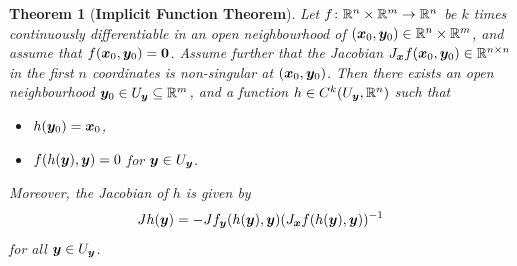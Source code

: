 \documentclass[11pt,a4paper]{memoir}
\newtheorem*{theorem*}{Theorem}
\begin{document}
\begin{theorem*}[\textbf{Implicit Function Theorem}]
Let $f\colon \mathbb{R}^n\times \mathbb{R}^m\to \mathbb{R}^n$ be $k$ times continuously differentiable in an open neighbourhood of $(\bm{x}_0,\bm{y}_0)\in \mathbb{R}^{n}\times \mathbb{R}^m$, and assume that $f(\bm{x}_0,\bm{y}_0) = \bm{0}$. Assume further 
that the Jacobian $J_{\bm{x}}f(\bm{x}_0,\bm{y}_0)\in \mathbb{R}^{n\times n}$ in the first $n$ coordinates is {\em non-singular} at $(\bm{x}_0,\bm{y}_0)$. Then there exists an open neighbourhood $\bm{y}_0\in U_{\bm{y}}\subseteq \mathbb{R}^m$, and a function $h\in C^k(U_{\bm{y}},\mathbb{R}^n)$ such that 
\begin{itemize}
 \item $h(\bm{y}_0) = \bm{x}_0$,
\item $f(h(\bm{y}),\bm{y})=0$ for $\bm{y}\in U_{\bm{y}}$.
\end{itemize}
Moreover, the Jacobian of $h$ is given by
\begin{equation*}
 Jh(\bm{y}) = -Jf_{\bm{y}}(h(\bm{y}),\bm{y}) (J_{\bm{x}}f(h(\bm{y}),\bm{y}))^{-1}
\end{equation*}
for all $\bm{y}\in U_{\bm{y}}$.
\end{theorem*}
\end{document}
